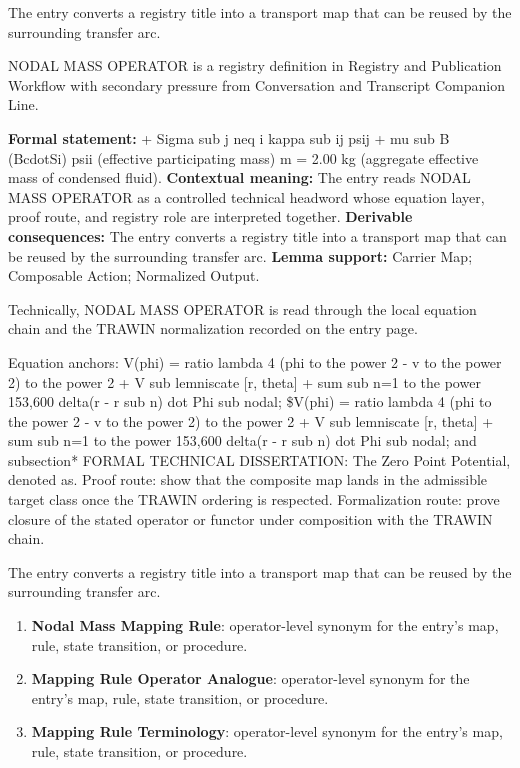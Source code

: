 The entry converts a registry title into a transport map that can be reused by the surrounding transfer arc.
\clearpage


\begingroup\small
{}
NODAL MASS OPERATOR is a registry definition in Registry and Publication Workflow with secondary pressure from Conversation and Transcript Companion Line.

\begingroup\footnotesize\setlength{\emergencystretch}{3em}\sloppy
\textbf{Formal statement:} + Sigma sub j neq i kappa sub ij psij + mu sub B (BcdotSi) psii (effective participating mass) m = 2.00 kg (aggregate effective mass of condensed fluid). \textbf{Contextual meaning:} The entry reads NODAL MASS OPERATOR as a controlled technical headword whose equation layer, proof route, and registry role are interpreted together. \textbf{Derivable consequences:} The entry converts a registry title into a transport map that can be reused by the surrounding transfer arc. \textbf{Lemma support:} Carrier Map; Composable Action; Normalized Output.\par
\endgroup

Technically, NODAL MASS OPERATOR is read through the local equation chain and the TRAWIN normalization recorded on the entry page.

Equation anchors: V(phi) = ratio lambda 4 (phi to the power 2 - v to the power 2) to the power 2 + V sub lemniscate [r, theta] + sum sub n=1 to the power 153,600 delta(r - r sub n) dot Phi sub nodal; \$V(phi) = ratio lambda 4 (phi to the power 2 - v to the power 2) to the power 2 + V sub lemniscate [r, theta] + sum sub n=1 to the power 153,600 delta(r - r sub n) dot Phi sub nodal; and subsection* FORMAL TECHNICAL DISSERTATION: The Zero Point Potential, denoted as. Proof route: show that the composite map lands in the admissible target class once the TRAWIN ordering is respected. Formalization route: prove closure of the stated operator or functor under composition with the TRAWIN chain.

The entry converts a registry title into a transport map that can be reused by the surrounding transfer arc.
\endgroup

\begin{enumerate}[leftmargin=1.6em,itemsep=6pt,topsep=4pt]
\item \textbf{Nodal Mass Mapping Rule}: operator-level synonym for the entry's map, rule, state transition, or procedure.
\item \textbf{Mapping Rule Operator Analogue}: operator-level synonym for the entry's map, rule, state transition, or procedure.
\item \textbf{Mapping Rule Terminology}: operator-level synonym for the entry's map, rule, state transition, or procedure.
\end{enumerate}

